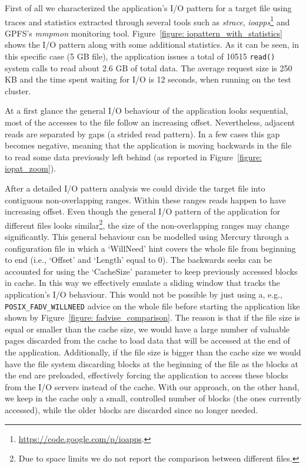 First of all we characterized the application's I/O pattern for a target file using traces and statistics extracted through several tools such as \textit{strace}, \textit{ioapps}\footnote{\url{https://code.google.com/p/ioapps}.} 
and GPFS's \textit{mmpmon} monitoring tool. 
Figure~\ref{figure: iopattern_with_statistics} shows the I/O pattern along with some additional statistics. As it can be seen, in this specific case (5 GB file), the application issues a total of 
10515 \texttt{read()} system calls to read about 2.6 GB of total data. The average request size is 250 KB and the time spent waiting for I/O is 12 seconds, when running on the test cluster. 

At a first glance the general I/O behaviour of the application looks sequential, most of the accesses to the file follow an increasing offset. Nevertheless, adjacent reads are separated by gaps 
(a strided read pattern). In a few cases this gap becomes negative, meaning that the application is moving backwards in the file to read some data previously left behind (as reported in 
Figure~\ref{figure: iopat_zoom}).

After a detailed I/O pattern analysis we could divide the target file into contiguous non-overlapping ranges. Within these ranges reads happen to have increasing offset. Even though the general 
I/O pattern of the application for different files looks similar\footnote{Due to space limits we do not report the comparison between different files.}, the size of the non-overlapping ranges may 
change significantly. This general behaviour can be modelled using Mercury through a configuration file in which a `WillNeed' hint covers the whole file from beginning to end (i.e., `Offset' and `Length' equal to 
0). The backwards seeks can be accounted for using the `CacheSize' parameter to keep previously accessed blocks in cache. In this way we effectively emulate a sliding window that tracks the application's 
I/O behaviour. This would not be possible by just using a, e.g., \texttt{POSIX\_FADV\_WILLNEED} advice on the whole file before starting the application like shown by Figure~\ref{figure: fadvise_comparison}. 
The reason is that if the file size is equal or smaller than the cache size, we would have a large number of valuable pages discarded from the cache to load data that will be accessed at the end of 
the application. Additionally, if the file size is bigger than the cache size we would have the file system discarding blocks at the beginning of the file as the blocks at the end are preloaded, 
effectively forcing the application to access these blocks from the I/O servers instead of the cache. With our approach, on the other hand, we keep in the cache only a small, controlled number of 
blocks (the ones currently accessed), while the older blocks are discarded since no longer needed. 

